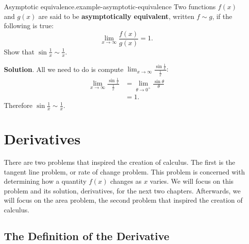 \documentclass[10pt,]{book}
\newcommand{\terminology}[1]{\textbf{#1}}
\numberwithin{equation}{section}
\begin{document}
\begin{example}{Asymptotic equivalence.}{example-asymptotic-equivalence}%
\hypertarget{p-72}{}%
Two functions \(f(x)\) and \(g(x)\) are said to be \terminology{asymptotically equivalent}, written \(f\sim g\), if the following is true:%
\begin{equation*}
\lim_{x\to\infty}\frac{f(x)}{g(x)} = 1.
\end{equation*}
Show that \(\sin\frac{1}{x}\sim\frac{1}{x}\).%
\par\smallskip%
\noindent\textbf{Solution}.\hypertarget{solution-15}{}\quad%
\hypertarget{p-73}{}%
All we need to do is compute \(\lim_{x\to\infty}\frac{\sin\frac{1}{x}}{\frac{1}{x}}:\)%
\begin{align*}
\lim_{x\to\infty}\frac{\sin\frac{1}{x}}{\frac{1}{x}} & = \lim_{\theta\to0^{+}}\frac{\sin\theta}{\theta} \\
& = 1. 
\end{align*}
Therefore \(\sin\frac{1}{x}\sim\frac{1}{x}\).%
\end{example}
%
%
\typeout{************************************************}
\typeout{************************************************}
%
\chapter[{Derivatives}]{Derivatives}\label{derivatives}
\begin{introduction}{}%
\hypertarget{p-74}{}%
There are two problems that inspired the creation of calculus. The first is the tangent line problem, or rate of change problem. This problem is concerned with determining how a quantity \(f(x)\) changes as \(x\) varies. We will focus on this problem and its solution, derivatives, for the next two chapters. Afterwards, we will focus on the area problem, the second problem that inspired the creation of calculus.%
\end{introduction}%
%
%
\typeout{************************************************}
\typeout{************************************************}
%
\section[{The Definition of the Derivative}]{The Definition of the Derivative}\label{section-the-definition-of-the-derivative}
%
%
\typeout{************************************************}
\typeout{************************************************}
%
\end{document}
